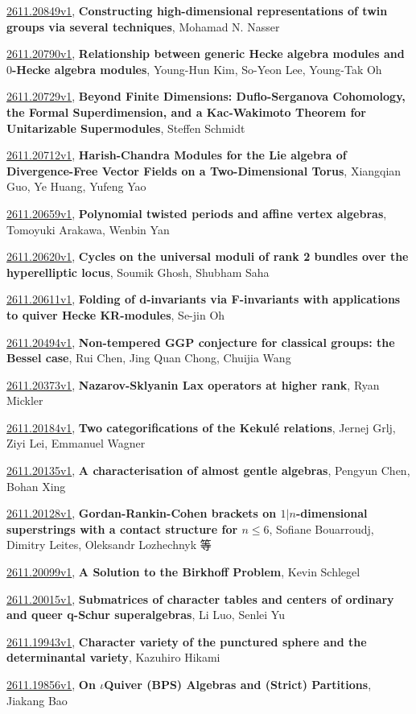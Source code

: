 \documentclass[9pt, a4paper]{article}
\theoremstyle{plain}
\theoremstyle{definition}
\theoremstyle{remark}
\newcommand{\arxiv}[3]{\href{https://arxiv.org/abs/#1}{#1}, \textbf{\textcolor{arxivblue}{#2}}, #3}
\begin{document}
\arxiv{2611.20849v1}{Constructing high-dimensional representations of twin groups via several techniques}{Mohamad N. Nasser}

\arxiv{2611.20790v1}{Relationship between generic Hecke algebra modules and $0$-Hecke algebra modules}{Young-Hun Kim, So-Yeon Lee, Young-Tak Oh}

\arxiv{2611.20729v1}{Beyond Finite Dimensions: Duflo-Serganova Cohomology, the Formal Superdimension, and a Kac-Wakimoto Theorem for Unitarizable Supermodules}{Steffen Schmidt}

\arxiv{2611.20712v1}{Harish-Chandra Modules for the Lie algebra of Divergence-Free Vector Fields on a Two-Dimensional Torus}{Xiangqian Guo, Ye Huang, Yufeng Yao}

\arxiv{2611.20659v1}{Polynomial twisted periods and affine vertex algebras}{Tomoyuki Arakawa, Wenbin Yan}

\arxiv{2611.20620v1}{Cycles on the universal moduli of rank 2 bundles over the hyperelliptic locus}{Soumik Ghosh, Shubham Saha}

\arxiv{2611.20611v1}{Folding of d-invariants via F-invariants with applications to quiver Hecke KR-modules}{Se-jin Oh}

\arxiv{2611.20494v1}{Non-tempered GGP conjecture for classical groups: the Bessel case}{Rui Chen, Jing Quan Chong, Chuijia Wang}

\arxiv{2611.20373v1}{Nazarov-Sklyanin Lax operators at higher rank}{Ryan Mickler}

\arxiv{2611.20184v1}{Two categorifications of the Kekulé relations}{Jernej Grlj, Ziyi Lei, Emmanuel Wagner}

\arxiv{2611.20135v1}{A characterisation of almost gentle algebras}{Pengyun Chen, Bohan Xing}

\arxiv{2611.20128v1}{Gordan-Rankin-Cohen brackets on $1|n$-dimensional superstrings with a contact structure for $n\leq 6$}{Sofiane Bouarroudj, Dimitry Leites, Oleksandr Lozhechnyk 等}

\arxiv{2611.20099v1}{A Solution to the Birkhoff Problem}{Kevin Schlegel}

\arxiv{2611.20015v1}{Submatrices of character tables and centers of ordinary and queer q-Schur superalgebras}{Li Luo, Senlei Yu}

\arxiv{2611.19943v1}{Character variety of the punctured sphere and the determinantal variety}{Kazuhiro Hikami}

\arxiv{2611.19856v1}{On $ι$Quiver (BPS) Algebras and (Strict) Partitions}{Jiakang Bao}
\end{document}
